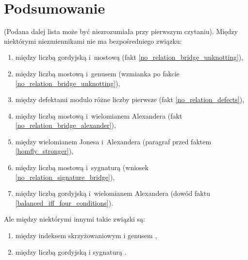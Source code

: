 













\section{Podsumowanie}
(Podana dalej lista może być niezrozumiała przy pierwszym czytaniu).
Między niektórymi niezmiennikami nie ma bezpośredniego związku:
\begin{enumerate}
    \item między liczbą gordyjską i~mostową (fakt \ref{no_relation_bridge_unknotting}),
    \item między liczbą mostową i~genusem (wzmianka po fakcie \ref{no_relation_bridge_unknotting}),
    \item między defektami modulo różne liczby pierwsze (fakt \ref{no_relation_defects}),
    \item między liczbą mostową i~wielomianem Alexandera (fakt \ref{no_relation_bridge_alexander}),
    \item między wielomianem Jonesa i~Alexandera (paragraf przed faktem \ref{homfly_stronger}),
    \item między liczbą mostową i~sygnaturą (wniosek \ref{no_relation_signature_bridge}),
    \item między liczbą gordyjską i~wielomianem Alexandera (dowód faktu \ref{balanced_iff_four_conditions}).
\end{enumerate}

Ale między niektórymi innymi takie związki są:
\begin{enumerate}
    \item między indeksem skrzyżowaniowym i genusem \cite[s. 142]{livingston1993},
    \item między liczbą gordyjską i sygnaturą \cite[s. 142]{livingston1993}.
\end{enumerate}



